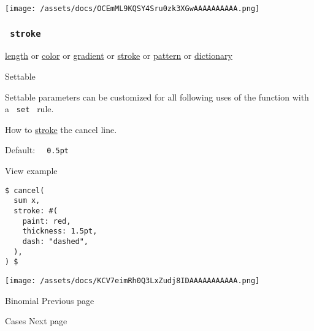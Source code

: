 \texttt{[image: /assets/docs/OCEmML9KQSY4Sru0zk3XGwAAAAAAAAAA.png]}

\subsubsection{\texorpdfstring{\texttt{\ stroke\ }}{ stroke }}\label{parameters-stroke}

\href{/docs/reference/layout/length/}{length} {or}
\href{/docs/reference/visualize/color/}{color} {or}
\href{/docs/reference/visualize/gradient/}{gradient} {or}
\href{/docs/reference/visualize/stroke/}{stroke} {or}
\href{/docs/reference/visualize/pattern/}{pattern} {or}
\href{/docs/reference/foundations/dictionary/}{dictionary}

{{ Settable }}

\label{parameters-stroke-settable-tooltip}
Settable parameters can be customized for all following uses of the
function with a \texttt{\ set\ } rule.

How to \href{/docs/reference/visualize/stroke/}{stroke} the cancel line.

Default: \texttt{\ }{\texttt{\ 0.5pt\ }}\texttt{\ }


View example

\begin{verbatim}
$ cancel(
  sum x,
  stroke: #(
    paint: red,
    thickness: 1.5pt,
    dash: "dashed",
  ),
) $
\end{verbatim}

\texttt{[image: /assets/docs/KCV7eimRh0Q3LxZudj8IDAAAAAAAAAAA.png]}

\href{/docs/reference/math/binom/}{\pandocbounded{}}

{ Binomial } { Previous page }

\href{/docs/reference/math/cases/}{\pandocbounded{}}

{ Cases } { Next page }
